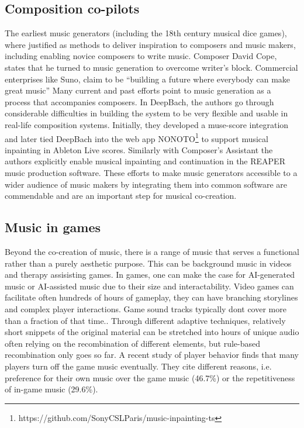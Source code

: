 \subsection{Composition co-pilots}
The earliest music generators (including the 18th century musical dice games), where justified as methods to deliver inspiration to composers and music makers, including enabling novice composers to write music. Composer David Cope\cite{Cope_1989}, states that he turned to music generation to overcome writer’s block. Commercial enterprises like Suno, claim to be “building a future where everybody can make great music” \cite{Suno_AI} Many current and past efforts point to music generation as a process that accompanies composers. In DeepBach\cite{Hadjeres_Pachet_Nielsen_2017}, the authors go through considerable difficulties in building the system to be very flexible and usable in real-life composition systems. Initially, they developed a muse-score integration and later tied DeepBach into the web app NONOTO\footnote{ https://github.com/SonyCSLParis/music-inpainting-ts} to support musical inpainting in Ableton Live scores. Similarly with Composer’s Assistant\cite{Malandro_2023} the authors explicitly enable musical inpainting and continuation in the REAPER music production software. These efforts to make music generators accessible to a wider audience of music makers by integrating them into common software are commendable and are an important step for musical co-creation.

\subsection{Music in games}
Beyond the co-creation of music, there is a range of music that serves a functional rather than a purely aesthetic purpose. This can be background music in videos and therapy assisisting games. In games, one can make the case for AI-generated music or AI-assisted music due to their size and interactability. 
Video games can facilitate often hundreds of hours of gameplay, they can have branching storylines and complex player interactions. Game sound tracks typically dont cover more than a fraction of that time.\cite{Plut_Pasquier_2020}\cite{Worrall_Collins_2024}. 
Through different adaptive techniques, relatively short snippets of the original material can be stretched into hours of unique audio often relying on the recombination of different elements, but rule-based recombination only goes so far. A recent study of player behavior \cite{Rogers_Weber_2019} finds that many players turn off the game music eventually. They cite different reasons, i.e. preference for their own music over the game music (46.7\%) or the repetitiveness of in-game music (29.6\%). 

